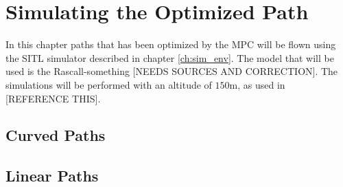 \chapter{Simulating the Optimized Path}

In this chapter paths that has been optimized by the MPC will be flown using the SITL simulator described in chapter \ref{ch:sim_env}. The model that will be used is the Rascall-something [NEEDS SOURCES AND CORRECTION]. The simulations will be performed with an altitude of $150$m, as used in [REFERENCE THIS].


\section{Curved Paths}


\section{Linear Paths}


